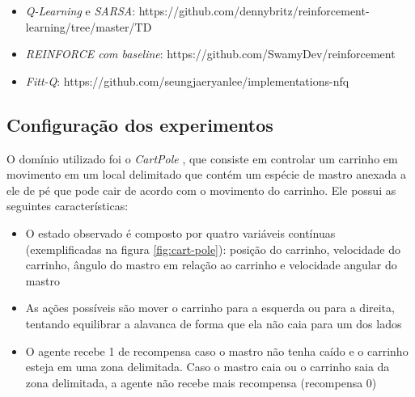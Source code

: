 \documentclass[letterpaper]{article}
\begin{document}
\begin{itemize}
  \item \textit{Q-Learning} e \textit{SARSA}: https://github.com/dennybritz/reinforcement-learning/tree/master/TD
  \item \textit{REINFORCE com baseline}: https://github.com/SwamyDev/reinforcement
  \item \textit{Fitt-Q}: https://github.com/seungjaeryanlee/implementations-nfq
\end{itemize}

\subsection{Configuração dos experimentos}

O domínio utilizado foi o \textit{CartPole} \cite{SuttonBarto-2018}, que consiste em controlar um carrinho em movimento em um local delimitado que contém um espécie de mastro anexada a ele de pé que pode cair de acordo com o movimento do carrinho. Ele possui as seguintes características:

\begin{itemize}
  \item O estado observado é composto por quatro variáveis contínuas (exemplificadas na figura \ref{fig:cart-pole}): posição do carrinho, velocidade do carrinho, ângulo do mastro em relação ao carrinho e velocidade angular do mastro
  \item As ações possíveis são mover o carrinho para a esquerda ou para a direita, tentando equilibrar a alavanca de forma que ela não caia para um dos lados
  \item O agente recebe 1 de recompensa caso o mastro não tenha caído e o carrinho esteja em uma zona delimitada. Caso o mastro caia ou o carrinho saia da zona delimitada, a agente não recebe mais recompensa (recompensa 0)
\end{itemize}
\end{document}
